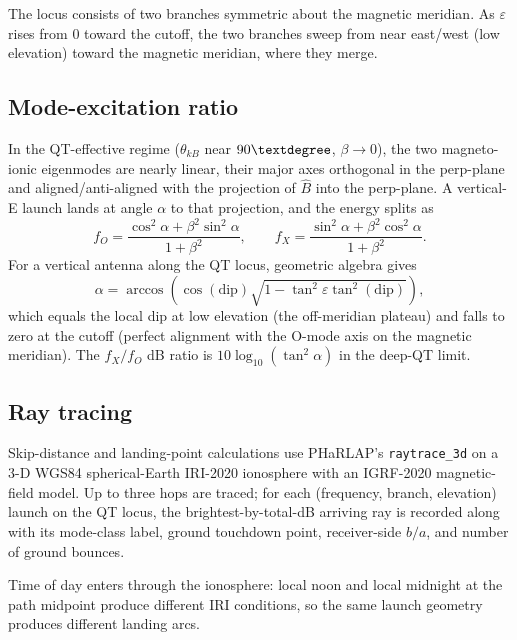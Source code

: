 \documentclass[11pt]{article}
\begin{document}
The locus consists of two branches symmetric about the magnetic
meridian.  As $\varepsilon$ rises from $0$ toward the cutoff, the
two branches sweep from near east/west (low elevation) toward the
magnetic meridian, where they merge.

\subsection*{Mode-excitation ratio}

In the QT-effective regime ($\theta_{kB}$ near $90\textdegree$,
$\beta\to 0$), the two magneto-ionic eigenmodes are nearly linear,
their major axes orthogonal in the perp-plane and aligned/anti-aligned
with the projection of $\hat{B}$ into the perp-plane.  A vertical-E
launch lands at angle $\alpha$ to that projection, and the energy
splits as
\begin{equation}
  f_O = \frac{\cos^2\alpha + \beta^2 \sin^2\alpha}{1+\beta^2}, \qquad
  f_X = \frac{\sin^2\alpha + \beta^2 \cos^2\alpha}{1+\beta^2}.
  \label{eq:fofx}
\end{equation}
For a vertical antenna along the QT locus, geometric algebra gives
\begin{equation}
  \alpha = \arccos\!\left(\cos(\mathrm{dip}) \sqrt{1 - \tan^2\varepsilon \tan^2(\mathrm{dip})}\right),
\end{equation}
which equals the local dip at low elevation (the off-meridian
plateau) and falls to zero at the cutoff (perfect alignment with the
O-mode axis on the magnetic meridian).  The $f_X/f_O$ dB ratio is
$10\log_{10}(\tan^2\alpha)$ in the deep-QT limit.

\subsection*{Ray tracing}

Skip-distance and landing-point calculations use PHaRLAP's
\texttt{raytrace\_3d} on a 3-D WGS84 spherical-Earth IRI-2020
ionosphere with an IGRF-2020 magnetic-field model.  Up to three hops
are traced; for each (frequency, branch, elevation) launch on the QT
locus, the brightest-by-total-dB arriving ray is recorded along with
its mode-class label, ground touchdown point, receiver-side $b/a$,
and number of ground bounces.

Time of day enters through the ionosphere: local noon and local
midnight at the path midpoint produce different IRI conditions, so
the same launch geometry produces different landing arcs.
\end{document}
